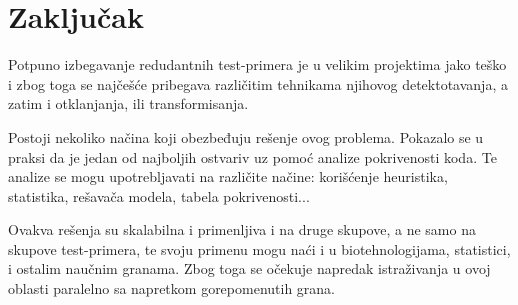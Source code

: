 \documentclass[a4paper]{article}
\theoremstyle{definition}
\begin{document}
\section{Zaključak}
\label{sec:zakljucak}
Potpuno izbegavanje redudantnih test-primera je u velikim projektima jako teško i zbog toga se najčešće pribegava različitim tehnikama njihovog detektotavanja, a zatim i otklanjanja, ili transformisanja.

Postoji nekoliko načina koji obezbeđuju rešenje ovog problema. Pokazalo se u praksi da je jedan od najboljih ostvariv uz pomoć analize pokrivenosti koda. Te analize se mogu upotrebljavati na različite načine: korišćenje heuristika, statistika, rešavača modela, tabela pokrivenosti...

Ovakva rešenja su skalabilna i primenljiva i na druge skupove, a ne samo na skupove test-primera, te svoju primenu mogu naći i u biotehnologijama, statistici, i ostalim naučnim granama. Zbog toga se očekuje napredak istraživanja u ovoj oblasti paralelno sa napretkom gorepomenutih grana.

\appendix
 

\end{document}
